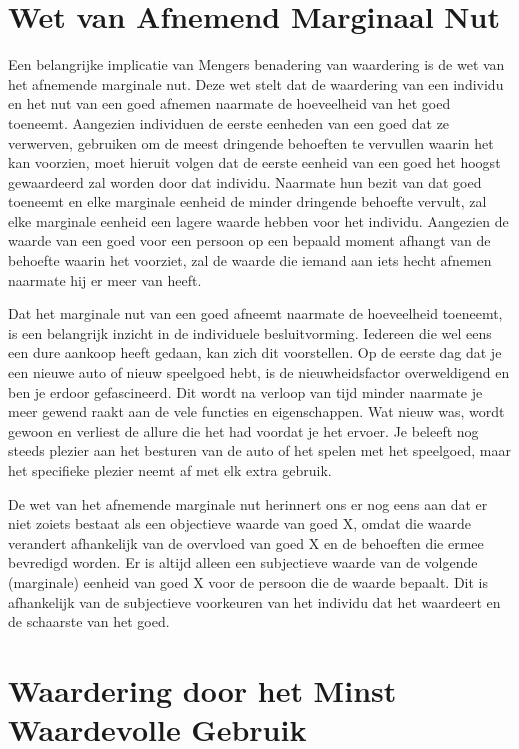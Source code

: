 \section{Wet van Afnemend Marginaal Nut}

Een belangrijke implicatie van Mengers benadering van waardering is de wet van het afnemende marginale nut. Deze wet stelt dat de waardering van een individu en het nut van een goed afnemen naarmate de hoeveelheid van het goed toeneemt. Aangezien individuen de eerste eenheden van een goed dat ze verwerven, gebruiken om de meest dringende behoeften te vervullen waarin het kan voorzien, moet hieruit volgen dat de eerste eenheid van een goed het hoogst gewaardeerd zal worden door dat individu. Naarmate hun bezit van dat goed toeneemt en elke marginale eenheid de minder dringende behoefte vervult, zal elke marginale eenheid een lagere waarde hebben voor het individu. Aangezien de waarde van een goed voor een persoon op een bepaald moment afhangt van de behoefte waarin het voorziet, zal de waarde die iemand aan iets hecht afnemen naarmate hij er meer van heeft.

Dat het marginale nut van een goed afneemt naarmate de hoeveelheid toeneemt, is een belangrijk inzicht in de individuele besluitvorming. Iedereen die wel eens een dure aankoop heeft gedaan, kan zich dit voorstellen. Op de eerste dag dat je een nieuwe auto of nieuw speelgoed hebt, is de nieuwheidsfactor overweldigend en ben je erdoor gefascineerd. Dit wordt na verloop van tijd minder naarmate je meer gewend raakt aan de vele functies en eigenschappen. Wat nieuw was, wordt gewoon en verliest de allure die het had voordat je het ervoer. Je beleeft nog steeds plezier aan het besturen van de auto of het spelen met het speelgoed, maar het specifieke plezier neemt af met elk extra gebruik.

De wet van het afnemende marginale nut herinnert ons er nog eens aan dat er niet zoiets bestaat als een objectieve waarde van goed X, omdat die waarde verandert afhankelijk van de overvloed van goed X en de behoeften die ermee bevredigd worden. Er is altijd alleen een subjectieve waarde van de volgende (marginale) eenheid van goed X voor de persoon die de waarde bepaalt. Dit is afhankelijk van de subjectieve voorkeuren van het individu dat het waardeert en de schaarste van het goed.

\section{Waardering door het Minst Waardevolle Gebruik}

